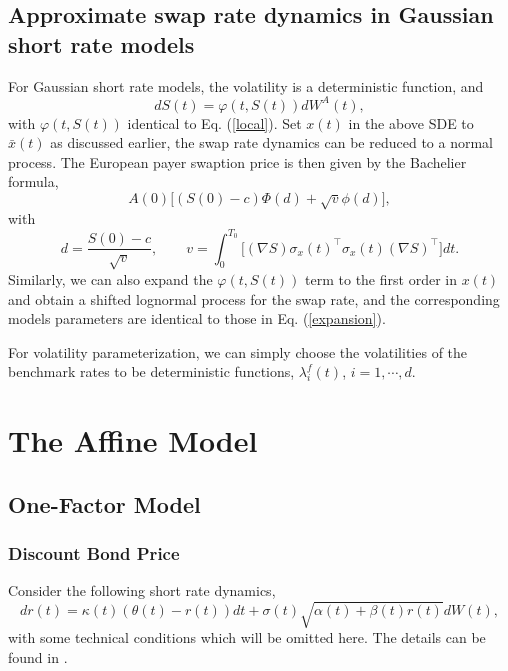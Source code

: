 \documentclass[12pt]{article}
\begin{document}
  \subsection{Approximate swap rate dynamics in Gaussian short rate models}

    For Gaussian short rate models, the volatility is a deterministic function, and
    \begin{equation}
      dS(t) = \varphi(t,S(t)) dW^A(t),
    \end{equation}
    with $\varphi(t,S(t))$ identical to Eq. (\ref{local}).
    Set $x(t)$ in the above SDE to $\bar{x}(t)$ as discussed earlier, the swap rate dynamics can be reduced to
    a normal process. The European payer swaption price is then given by the Bachelier formula,
    \begin{equation}
      A(0)\Big[\left(S(0)-c\right)\Phi(d)+\sqrt{v}\phi(d)\Big],
    \end{equation}
    with
    \begin{equation}
      d=\frac{S(0)-c}{\sqrt{v}},\quad\quad v=\int_0^{T_0}\Big[(\nabla S)\sigma_x(t)^{\top}\sigma_x(t)(\nabla S)^{\top}\Big]dt.
    \end{equation}
    Similarly, we can also expand the $\varphi(t,S(t))$ term to the first order in $x(t)$ and obtain a
    shifted lognormal process for the swap rate, and the corresponding models parameters are identical to those in Eq. (\ref{expansion}).

    For volatility parameterization, we can simply choose the volatilities of the benchmark rates to be deterministic functions, $\lambda_i^f(t)$,
    $i=1,\cdots,d$.


\section{The Affine Model}

  \subsection{One-Factor Model}

    \subsubsection{Discount Bond Price}

      Consider the following short rate dynamics,
      \begin{equation}
        dr(t)=\kappa(t)\left(\theta(t)-r(t)\right)dt + \sigma(t)\sqrt{\alpha(t) + \beta(t) r(t)}dW(t),
      \end{equation}
      with some technical conditions which will be omitted here. The details can be found in \cite{AP}.
\end{document}
